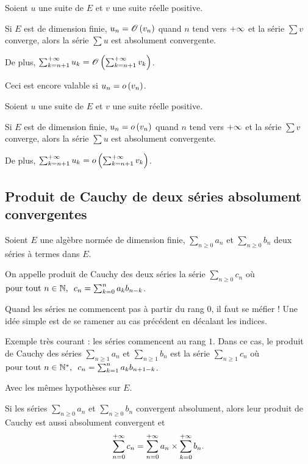 \begin{prop}
Soient \(u\) une suite de \(E\) et \(v\) une suite réelle positive.

Si \(E\) est de dimension finie, \(u_n=\mathscr{O}\left(v_n\right)\) quand \(n\) tend vers \(+\infty\) et la série \(\sum v\) converge, alors la série \(\sum u\) est absolument convergente.

De plus, \(\sum_{k=n+1}^{+\infty}u_k=\mathscr{O}\left(\sum_{k=n+1}^{+\infty}v_k\right)\).
\end{prop}

Ceci est encore valable si \(u_n=o\left(v_n\right)\).

\begin{prop}
Soient \(u\) une suite de \(E\) et \(v\) une suite réelle positive.

Si \(E\) est de dimension finie, \(u_n=o\left(v_n\right)\) quand \(n\) tend vers \(+\infty\) et la série \(\sum v\) converge, alors la série \(\sum u\) est absolument convergente.

De plus, \(\sum_{k=n+1}^{+\infty}u_k=o\left(\sum_{k=n+1}^{+\infty}v_k\right)\).
\end{prop}

\subsection{Produit de Cauchy de deux séries absolument convergentes}

\begin{defi}
Soient \(E\) une algèbre normée de dimension finie, \(\sum_{n\geq0}a_n\) et \(\sum_{n\geq0}b_n\) deux séries à termes dans \(E\).

On appelle produit de Cauchy des deux séries la série \(\sum_{n\geq0}c_n\) où \(\quantifs{\tpt n\in\N}c_n=\sum_{k=0}^na_kb_{n-k}\).
\end{defi}

\begin{rem}
Quand les séries ne commencent pas à partir du rang \(0\), il faut se méfier ! Une idée simple est de se ramener au cas précédent en décalant les indices.

Exemple très courant : les séries commencent au rang \(1\). Dans ce cas, le produit de Cauchy des séries \(\sum_{n\geq1}a_n\) et \(\sum_{n\geq1}b_n\) est la série \(\sum_{n\geq1}c_n\) où \(\quantifs{\tpt n\in\Ns}c_n=\sum_{k=1}^{n}a_kb_{n+1-k}\).
\end{rem}

\begin{theo}
Avec les mêmes hypothèses sur \(E\).

Si les séries \(\sum_{n\geq0}a_n\) et \(\sum_{n\geq0}b_n\) convergent absolument, alors leur produit de Cauchy est aussi absolument convergent et \[\sum_{n=0}^{+\infty}c_n=\sum_{n=0}^{+\infty}a_n\times\sum_{k=0}^{+\infty}b_n.\]
\end{theo}

